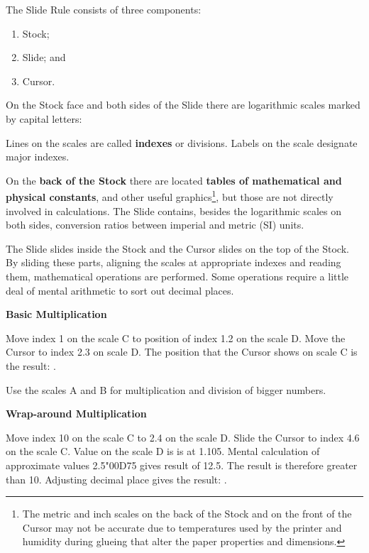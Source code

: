   \begin{multicols*}{3}
  \normalsize{
  The Slide Rule consists of three components:
    \begin{enumerate}
      \setlength{\parskip}{0pt}
      \setlength{\parsep}{0pt}
      \item Stock;
      \item Slide; and
      \item Cursor.
    \end{enumerate}

  On the Stock face and both sides of the Slide there are logarithmic scales marked by capital letters:

  
  Lines on the scales are called \textbf{indexes} or divisions. Labels on the scale designate major indexes.

  On the \textbf{back of the Stock} there are located \textbf{tables of mathematical and physical constants}, and other useful graphics\footnote{The metric and inch scales on the back of the Stock and on the front of the Cursor may not be accurate due to temperatures used by the printer and humidity during glueing that alter the paper properties and dimensions.}, but those are not directly involved in calculations. The Slide contains, besides the logarithmic scales on both sides, conversion ratios between imperial and metric (SI) units.

  The Slide slides inside the Stock and the Cursor slides on the top of the Stock. By sliding these parts, aligning the scales at appropriate indexes and reading them, mathematical operations are performed. Some operations require a little deal of mental arithmetic to sort out decimal places.

  

  \textbf{Basic Multiplication}

Move index 1 on the scale C to position of index 1.2 on the scale D.
Move the Cursor to index 2.3 on scale D.
The position that the Cursor shows on scale C is the result: .

\footnotesize Use the scales A and B for multiplication and division of bigger numbers.
\normalsize

  \textbf{Wrap-around Multiplication}

Move index 10 on the scale C to 2.4 on the scale D.
Slide the Cursor to index 4.6 on the scale C.
Value on the scale D is is at 1.105.
Mental calculation of approximate values 2.5{\char"00D7}5 gives result of 12.5.
The result is therefore greater than 10.
Adjusting decimal place gives the result: . 

}
\end{multicols*}

